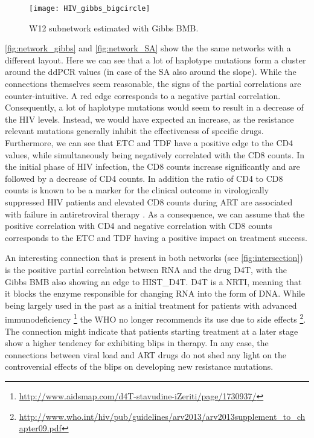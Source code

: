 \begin{figure}
	\centering
	\texttt{[image: HIV\_gibbs\_bigcircle]}
	
	\caption{W12 subnetwork estimated with Gibbs BMB.}
	\label{fig:bignetworkcircle}
\end{figure}
\begin{figure}
	\centering
	
\end{figure}
\autoref{fig:network_gibbs} and \autoref{fig:network_SA} show the the same networks with a different layout.
Here we can see that a lot of haplotype mutations form a cluster around the ddPCR values (in case of the SA also around the slope).
While the connections themselves seem reasonable, the signs of the partial correlations are counter-intuitive.
A red edge corresponds to a negative partial correlation.
Consequently, a lot of haplotype mutations would seem to result in a decrease of the HIV levels.
Instead, we would have expected an increase, as the resistance relevant mutations generally inhibit the effectiveness of specific drugs.
Furthermore, we can see that ETC and TDF have a positive edge to the CD4 values, while simultaneously being negatively correlated with the CD8 counts. 
In the initial phase of HIV infection, the CD8 counts increase significantly and are followed by a decrease of CD4 counts.
In addition the ratio of CD4 to CD8 counts is known to be a marker for the clinical outcome in virologically suppressed HIV patients \citep{lu2015cd4} and elevated CD8 counts during ART are associated with failure in antiretroviral therapy \citep{krantz2011elevated}.
As a consequence, we can assume that the positive correlation with CD4 and negative correlation with CD8 counts corresponds to the ETC and TDF having a positive impact on treatment success.

An interesting connection that is present in both networks (see \autoref{fig:intersection}) is the positive partial correlation between RNA and the drug \gls{D4T},
with the Gibbs BMB also showing an edge to HIST\_D4T.
\gls{D4T} is a \gls{NRTI}, meaning that it blocks the enzyme responsible for changing RNA into the form of DNA.
While being largely used in the past as a initial treatment for patients with advanced immunodeficiency \footnote{\href{http://www.aidsmap.com/d4T-stavudine-iZeriti/page/1730937/}{http://www.aidsmap.com/d4T-stavudine-iZeriti/page/1730937/}}
the \gls{WHO} no longer recommends its use due to side effects
 \footnote{
 	\href{http://www.who.int/hiv/pub/guidelines/arv2013/arv2013supplement_to_chapter09.pdf}
	{http://www.who.int/hiv/pub/guidelines/arv2013/arv2013supplement\_to\_chapter09.pdf}}.
The connection might indicate that patients starting treatment at a later stage show a higher tendency for exhibiting blips in therapy.
In any case, the connections between viral load and \gls{ART} drugs do not shed any light on the controversial effects of the blips on developing new resistance mutations.


